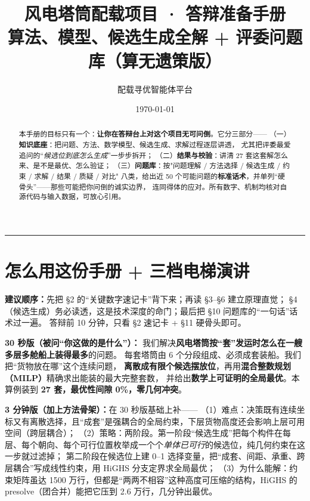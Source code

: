 \documentclass[11pt]{ctexart}
\title{\textbf{风电塔筒配载项目 · 答辩准备手册}\\[3pt]
\large 算法、模型、候选生成全解 + 评委问题库（算无遗策版）}
\author{配载寻优智能体平台}
\date{\today}
\begin{document}
\maketitle

\begin{abstract}
\noindent
本手册的目标只有一个：\textbf{让你在答辩台上对这个项目无可问倒}。它分三部分——
（一）\textbf{知识底座}：把问题、方法、数学模型、候选生成、求解过程逐层讲透，
尤其把评委最爱追问的“\emph{候选位到底怎么生成}”一步步拆开；
（二）\textbf{结果与校验}：讲清 27 套这套解怎么来、是不是最优、怎么验证；
（三）\textbf{问题库}：按"问题理解 / 方法选择 / 候选生成 / 约束 / 求解 / 结果 / 质疑 / 对比"
八类，给出近 50 个可能问题的\textbf{标准话术}，并单列“硬骨头”——那些可能把你问倒的诚实边界，
连同得体的应对。所有数字、机制均核对自源代码与输入数据，可放心引用。
\end{abstract}

\tableofcontents
\bigskip\hrule\bigskip

\section{怎么用这份手册 + 三档电梯演讲}

\textbf{建议顺序：}先把 \S2 的“关键数字速记卡”背下来；再读 \S3--\S6 建立原理直觉；
\S4（候选生成）务必读透，这是技术深度的命门；最后把 \S10 问题库的“一句话”话术过一遍。
答辩前 10 分钟，只看 \S2 速记卡 + \S11 硬骨头即可。

\begin{key}
\textbf{30 秒版（被问“你这做的是什么”）：}
我们解决\textbf{风电塔筒按“套”发运时怎么在一艘多层多舱船上装得最多}的问题。
每套塔筒由 6 个分段组成、必须成套装船。我们把“货物放在哪”这个连续问题，
\textbf{离散成有限个候选摆放位}，再用\textbf{混合整数规划（MILP）}精确求出能装的最大完整套数，
并给出\textbf{数学上可证明的全局最优}。本算例装到 \textbf{27 套，最优性间隙 0\%，零几何冲突}。
\end{key}

\textbf{3 分钟版（加上方法骨架）：}在 30 秒版基础上补——
（1）难点：决策既有连续坐标又有离散选择，且“成套”是强耦合的全局约束，下层货物高度还会影响上层可用空间（跨层耦合）；
（2）策略：两阶段。第一阶段“候选生成”把每个构件在每层、每个朝向、每个可行位置枚举成一个个\emph{单体已可行}的候选位，纯几何约束在这一步就过滤掉；
第二阶段在候选位上建 0--1 选择变量，把“成套、间距、承重、跨层耦合”写成线性约束，用 HiGHS 分支定界求全局最优；
（3）为什么能解：约束矩阵虽达 1500 万行，但都是“两两不相容”这种高度可压缩的结构，HiGHS 的 presolve（团合并）能把它压到 2.6 万行，几分钟出最优。
\end{document}
